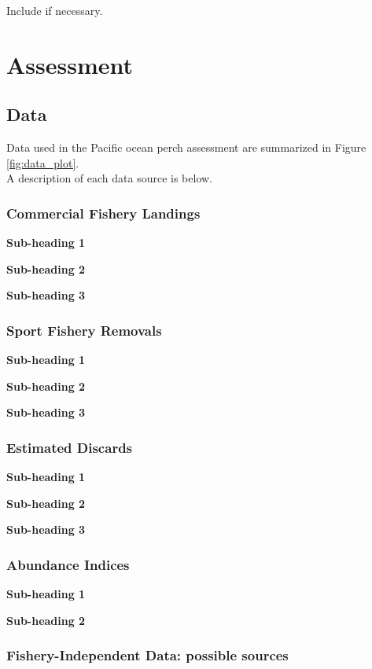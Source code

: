 \documentclass[12pt,]{article}
\begin{document}
Include if necessary.

\section{Assessment}\label{assessment}

\subsection{Data}\label{data}

Data used in the Pacific ocean perch assessment are summarized in Figure
\ref{fig:data_plot}.\\
A description of each data source is below.

\subsubsection{Commercial Fishery
Landings}\label{commercial-fishery-landings}

\textbf{Sub-heading 1}

\textbf{Sub-heading 2}

\textbf{Sub-heading 3}

\subsubsection{Sport Fishery Removals}\label{sport-fishery-removals}

\textbf{Sub-heading 1}

\textbf{Sub-heading 2}

\textbf{Sub-heading 3}

\subsubsection{Estimated Discards}\label{estimated-discards}

\textbf{Sub-heading 1}

\textbf{Sub-heading 2}

\textbf{Sub-heading 3}

\subsubsection{Abundance Indices}\label{abundance-indices}

\textbf{Sub-heading 1}

\textbf{Sub-heading 2}

\subsubsection{Fishery-Independent Data: possible
sources}\label{fishery-independent-data-possible-sources}
\end{document}
